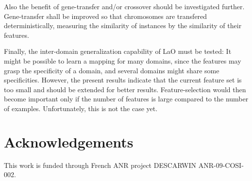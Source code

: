 \documentclass{MYsig-alternate}
\begin{document}
Also the benefit of gene-transfer and/or crossover should be investigated further. Gene-transfer shall be improved so that chromosomes are transfered deterministically, measuring the similarity of instances by the similarity of their features.

Finally, the inter-domain generalization capability of LaO must be tested: It might be possible to learn a mapping for many domains, since the features may grasp the specificity of a domain, and several domains might share some specificities. However, the present results indicate that the current feature set is too small and should be extended for better results. Feature-selection would then become important only if the number of features is large compared to the number of examples. Unfortunately, this is not the case yet.\\


\section{Acknowledgements}
This work is funded through French ANR project DESCARWIN ANR-09-COSI-002.




\end{document}
